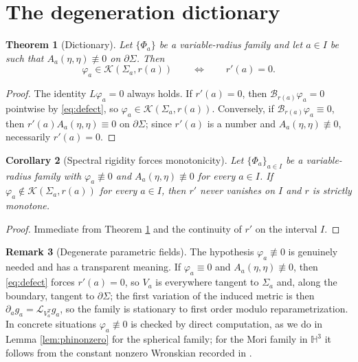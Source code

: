 \documentclass[11pt,a4paper]{amsart}
\theoremstyle{plain}
\newtheorem{theorem}{Theorem}[section]
\newtheorem{corollary}[theorem]{Corollary}
\theoremstyle{definition}
\newtheorem{remark}[theorem]{Remark}
\newcommand{\Hyp}{\mathbb{H}}
\newcommand{\Ker}{\mathcal{K}}
\begin{document}
\section{The degeneration dictionary}\label{sec:dictionary}

\begin{theorem}[Dictionary]\label{thm:dictionary}
Let $\{\Phi_a\}$ be a variable-radius family and let $a\in I$ be such that $A_a(\eta,\eta)\not\equiv 0$ on $\partial\Sigma$. Then
\[
\varphi_a\in\Ker(\Sigma_a,r(a))\qquad\Longleftrightarrow\qquad r'(a)=0 .
\]
\end{theorem}

\begin{proof}
The identity $L\varphi_a=0$ always holds. If $r'(a)=0$, then $\mathcal{B}_{r(a)}\varphi_a=0$ pointwise by \eqref{eq:defect}, so $\varphi_a\in\Ker(\Sigma_a,r(a))$. Conversely, if $\mathcal{B}_{r(a)}\varphi_a\equiv 0$, then $r'(a)A_a(\eta,\eta)\equiv 0$ on $\partial\Sigma$; since $r'(a)$ is a number and $A_a(\eta,\eta)\not\equiv 0$, necessarily $r'(a)=0$.
\end{proof}

\begin{corollary}[Spectral rigidity forces monotonicity]\label{cor:monotone}
Let $\{\Phi_a\}_{a\in I}$ be a variable-radius family with $\varphi_a\not\equiv 0$ and $A_a(\eta,\eta)\not\equiv 0$ for every $a\in I$. If $\varphi_a\notin\Ker(\Sigma_a,r(a))$ for every $a\in I$, then $r'$ never vanishes on $I$ and $r$ is strictly monotone.
\end{corollary}

\begin{proof}
Immediate from Theorem \ref{thm:dictionary} and the continuity of $r'$ on the interval $I$.
\end{proof}

\begin{remark}[Degenerate parametric fields]\label{rem:degenerate}
The hypothesis $\varphi_a\not\equiv 0$ is genuinely needed and has a transparent meaning. If $\varphi_a\equiv 0$ and $A_a(\eta,\eta)\not\equiv 0$, then \eqref{eq:defect} forces $r'(a)=0$, so $V_a$ is everywhere tangent to $\Sigma_a$ and, along the boundary, tangent to $\partial\Sigma$; the first variation of the induced metric is then $\partial_ag_a=\mathcal{L}_{V_a^T}g_a$, so the family is stationary to first order modulo reparametrization. In concrete situations $\varphi_a\not\equiv 0$ is checked by direct computation, as we do in Lemma \ref{lem:phinonzero} for the spherical family; for the Mori family in $\Hyp^3$ it follows from the constant nonzero Wronskian recorded in \cite[Lem. 11.1]{P1}.
\end{remark}
\end{document}
